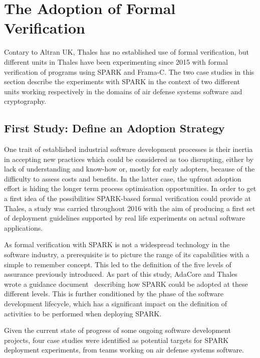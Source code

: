 \documentclass{llncs}
\begin{document}
\section{The Adoption of Formal Verification}
\label{sec:adoption}

Contary to Altran UK, Thales has no established use of formal verification, but
different units in Thales have been experimenting since 2015 with formal
verification of programs using SPARK and Frama-C. The two case studies in this
section describe the experiments with SPARK in the context of two different
units working respectively in the domains of air defense systems software and cryptography.

\subsection{First Study: Define an Adoption Strategy}

One trait of established industrial software development processes is their
inertia in accepting new practices which could be considered as too disrupting,
either by lack of understanding and know-how or, mostly for early adopters,
because of the difficulty to assess costs and benefits. In the latter case, the
upfront adoption effort is hiding the longer term process optimisation
opportunities. In order to get a first idea of the possibilities SPARK-based
formal verification could provide at Thales, a study was carried throughout
2016 with the aim of producing a first set of deployment guidelines supported
by real life experiments on actual software applications.

As formal verification with SPARK is not a widespread technology in the
software industry, a prerequisite is to picture the range of its capabilities
with a simple to remember concept. This led to the definition of the five
levels of assurance previously introduced. As part of this study, AdaCore and
Thales wrote a guidance document~\cite{AdaCoreThalesSPARK} describing how SPARK
could be adopted at these different levels. This is further conditioned by the
phase of the software development lifecycle, which has a significant impact on
the definition of activities to be performed when deploying SPARK.

Given the current state of progress of some ongoing software development
projects, four case studies were identified as potential targets for SPARK
deployment experiments, from teams working on air defense systems software.
\end{document}
